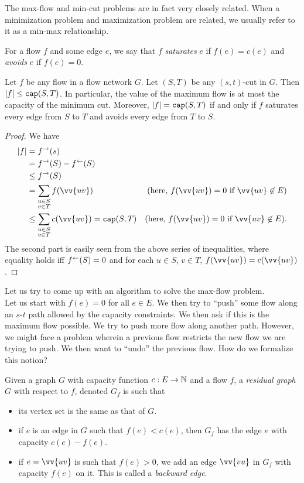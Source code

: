 The max-flow and min-cut problems are in fact very closely related. When a minimization problem and maximization problem are related, we usually refer to it as a min-max relationship.

For a flow $f$ and some edge $e$, we say that $f$ \textit{saturates} $e$ if $f(e)=c(e)$ and \textit{avoids} $e$ if $f(e)=0$.

\begin{lemma}
	Let $f$ be any flow in a flow network $G$. Let $(S,T)$ be any $(s,t)$-cut in $G$. Then $|f|\leq\texttt{cap}(S,T)$. In particular, the value of the maximum flow is at most the capacity of the minimum cut. Moreover, $|f|=\texttt{cap}(S,T)$ if and only if $f$ saturates every edge from $S$ to $T$ and avoids every edge from $T$ to $S$.
\end{lemma}
\begin{proof}
	We have
	\begin{align*}
		|f| &= f^\to(s) \\
			&= f^\to(S) - f^\ot(S) \\
			&\leq f^\to(S) \\
			&= \sum_{\substack{u\in S \\ v\in T}} f(\vv{uv}) & (\text{here, }f(\vv{uv})=0\text{ if }\vv{uv}\not\in E) \\
			&\leq \sum_{\substack{u\in S \\ v\in T}} c(\vv{uv})  = \capp(S,T) & (\text{here, }f(\vv{uv})=0\text{ if }\vv{uv}\not\in E). \\
	\end{align*}
	The second part is easily seen from the above series of inequalities, where equality holds iff $f^\leftarrow(S)=0$ and for each $u\in S$, $v\in T$, $f(\vv{uv})=c(\vv{uv})$.
\end{proof}

Let us try to come up with an algorithm to solve the max-flow problem.\\
Let us start with $f(e)=0$ for all $e\in E$. We then try to ``push'' some flow along an $s$-$t$ path allowed by the capacity constraints. We then ask if this is the maximum flow possible. We try to push more flow along another path. However, we might face a problem wherein a previous flow restricts the new flow we are trying to push. We then want to ``undo'' the previous flow. How do we formalize this notion?

\begin{definition}
	Given a graph $G$ with capacity function $c:E\to\mathbb{N}$ and a flow $f$, a \textit{residual graph} $G$ with respect to $f$, denoted $G_f$ is such that
	\begin{itemize}
		\item its vertex set is the same as that of $G$.
		\item if $e$ is an edge in $G$ such that $f(e)<c(e)$, then $G_f$ has the edge $e$ with capacity $c(e)-f(e)$.
		\item if $e=\vv{uv}$ is such that $f(e)>0$, we add an edge $\vv{vu}$ in $G_f$ with capacity $f(e)$ on it. This is called a \textit{backward edge}.
	\end{itemize}
\end{definition}

